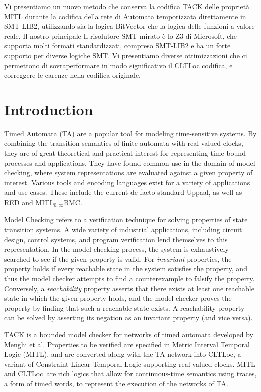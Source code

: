 \documentclass[a4paper,11pt]{report}
\theoremstyle{definition}
\newcommand{\cltloc}{CLTLoc}
\begin{document}
Vi presentiamo un nuovo metodo che conserva la codifica TACK delle proprietà
MITL durante la codifica della rete di Automata temporizzata direttamente in
SMT-LIB2, utilizzando sia la logica BitVector che la logica delle funzioni a
valore reale. Il nostro principale Il risolutore SMT mirato è lo Z3 di
Microsoft, che supporta molti formati standardizzati, compreso SMT-LIB2 e ha un
forte supporto per diverse logiche SMT. Vi presentiamo diverse ottimizzazioni
che ci permettono di sovraperformare in modo significativo il CLTLoc codifica, e
correggere le carenze nella codifica originale.

\chapter{Introduction}\label{introduction}

Timed Automata\cite{alur94} (TA) are a popular tool for modeling time-sensitive
systems. By combining the transition semantics of finite automata with
real-valued clocks, they are of great theoretical and practical interest for
representing time-bound processes and applications. They have found common use
in the domain of model checking, where system representations are evaluated
against a given property of interest. Various tools and encoding languages exist
for a variety of applications and use cases. These include the current de facto
standard Uppaal\cite{larsen97}, as well as RED and
$\text{MITL}_{0,\infty}$BMC\cite{kindermann13}.

Model Checking refers to a verification technique for solving properties of
state transition systems. A wide variety of industrial applications, including
circuit design, control systems, and program verification lend themselves to
this representation. In the model checking process, the system is exhaustively
searched to see if the given property is valid. For \emph{invariant} properties,
the property holds if every reachable state in the system satisfies the
property, and thus the model checker attempts to find a counterexample to
falsify the property. Conversely, a \emph{reachability} property asserts that
there exists at least one reachable state in which the given property holds, and
the model checker proves the property by finding that such a reachable state
exists. A reachability property can be solved by asserting its negation as an
invariant property (and vice versa).


TACK is a bounded model checker for networks of timed automata developed by
Menghi et al\cite{tack20}. Properties to be verified are specified in Metric
Interval Temporal Logic (MITL), and are converted along with the TA network into
\cltloc, a variant of Constraint Linear Temporal Logic supporting real-valued
clocks. MITL and \cltloc\ are rich logics that allow for continuous-time
semantics using traces, a form of timed words, to represent the execution of the
networks of TA.
\end{document}
